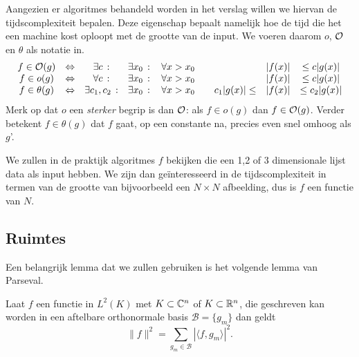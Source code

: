 Aangezien er algoritmes behandeld worden in het verslag willen we hiervan de tijdscomplexiteit bepalen.
Deze eigenschap bepaalt namelijk hoe de tijd die het een machine kost oploopt met de grootte van de input.
We voeren daarom $o$, $\mathcal{O}$ en $\theta$ als notatie in.
\begin{equation*}
\begin{array}{cccccccc}
  f \in \mathcal{O}(g)     &\Leftrightarrow& \exists c     \,:&\exists x_0  \,:&\, 
  \forall x>x_0 \quad&& |f(x)| &\leq c|g(x)|  \\
  f \in o(g)      &\Leftrightarrow& \forall c     \,:&\exists x_0  \,:&\, 
  \forall x>x_0 \quad&& |f(x)| &\leq c |g(x)| \\ 
  f \in \theta(g) &\Leftrightarrow& \exists c_1,c_2\,:&\exists x_0  \,:&\, 
  \forall x>x_0 \quad& c_1|g(x)| \leq & |f(x)| &\leq c_2|g(x)| 
\end{array}
\end{equation*}
Merk op dat $o$ een \emph{sterker} begrip is dan $\mathcal{O}$: als $f \in o(g)$ dan $f \in \mathcal{O}(g)$. Verder betekent $f \in \theta(g)$ dat $f$ gaat, op een constante na, precies even snel omhoog als $g$'.

We zullen in de praktijk algoritmes $f$ bekijken die een 1,2 of 3 dimensionale lijst data als input hebben.
We zijn dan ge\"interesseerd in de tijdscomplexiteit in termen van de grootte van bijvoorbeeld een $N\times N$ 
afbeelding, dus is $f$ een functie van $N$.

\subsection{Ruimtes}
Een belangrijk lemma dat we zullen gebruiken is het volgende lemma van Parseval.
\begin{lemm}
  \label{parseval}
  Laat $f$ een functie in $L^2(K)$ met $K \subset \mathbb{C}^n$ of $K\subset\mathbb{R}^n$, die geschreven kan worden in een aftelbare 
  orthonormale basis $\mathcal{B}=\{g_m\}$ dan geldt
  \[
  \|f\|^2 = \sum_{g_m\in\mathcal{B}} | \langle f, g_m \rangle |^2.
  \]
\end{lemm}

